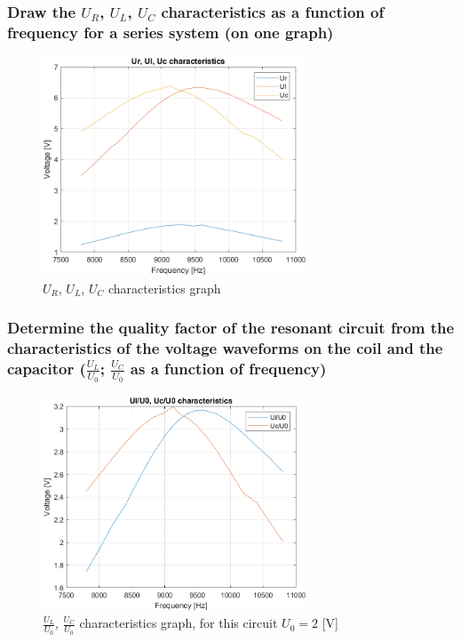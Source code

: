 \documentclass[]{scrartcl}
\begin{document}
\subsubsection{Draw the $U_R$, $U_L$, $U_C$ characteristics as a function of frequency for a series system (on one graph)}

\begin{figure}[H]
	\centering
	\includegraphics[width=0.7\textwidth]{Pictures/ct_char_01.png}
	\caption{$U_R$, $U_L$, $U_C$ characteristics graph}
	\label{fig:Ur, Ul, Uc char}
\end{figure}

\subsubsection{Determine the quality factor of the resonant circuit from the characteristics of
the voltage waveforms on the coil and the capacitor ($\frac{U_L}{U_0}$; $\frac{U_C}{U_0}$ as a function of frequency)}

\begin{figure}[H]
	\centering
	\includegraphics[width=0.7\textwidth]{Pictures/ct_char_02.png}
	\caption{$\frac{U_L}{U_0}$, $\frac{U_C}{U_0}$ characteristics graph, for this circuit $U_0=2$ [V]}
	\label{fig:Ul/U0, Uc/U0 char}
\end{figure}
\end{document}
